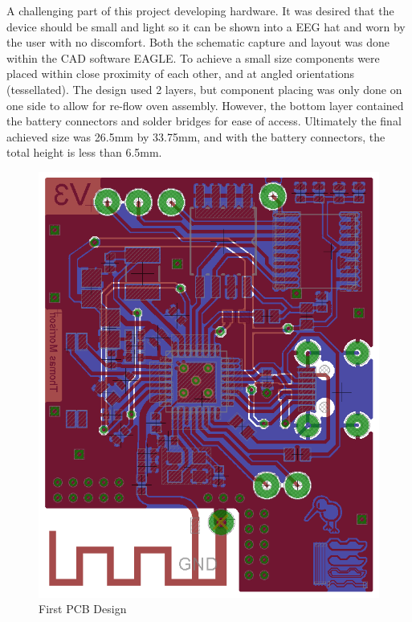 \documentclass[]{article}
\begin{document}
A challenging part of this project developing hardware. It was desired that the device should be small and light so it can be shown into a \ac{EEG} hat and worn by the user with no discomfort. Both the schematic capture and layout was done within the \ac{CAD} software EAGLE. To achieve a small size components were placed within close proximity of each other, and at angled orientations (tessellated). The design used 2 layers, but component placing was only done on one side to allow for re-flow oven assembly. However, the bottom layer contained the battery connectors and solder bridges for ease of access. Ultimately the final achieved size was 26.5mm by 33.75mm, and with the battery connectors, the total height is less than 6.5mm.

\begin{figure}[H]
	\begin{center}
		\includegraphics[width = \textwidth]{boardv1}
	\end{center}
	\caption{First PCB Design}
	\label{fig:boardv1}
\end{figure}
\end{document}
